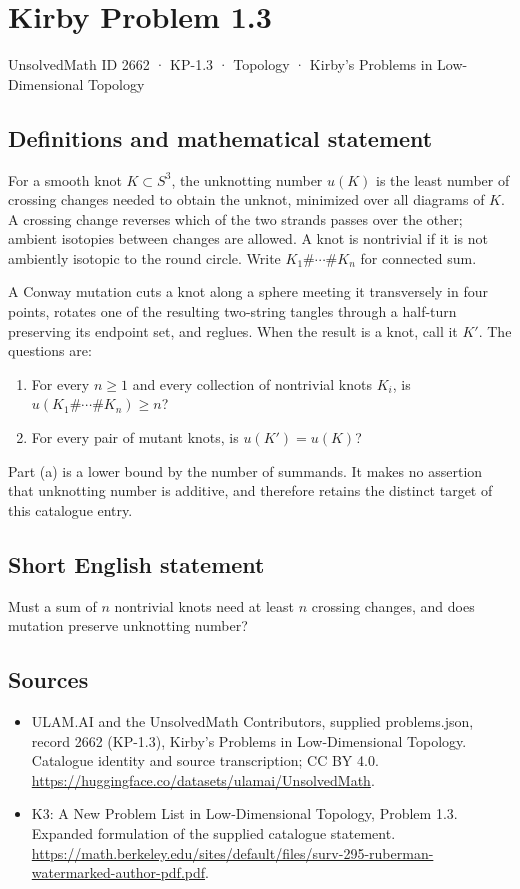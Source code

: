 \documentclass[11pt,a4paper]{article}
\begin{document}
\section*{Kirby Problem 1.3}\label{2662}
{\small UnsolvedMath ID 2662 · KP-1.3 · Topology · Kirby's Problems in Low-Dimensional Topology}
\subsection{Definitions and mathematical statement}
For a smooth knot $K\subset S^3$, the unknotting number $u(K)$ is the least number
of crossing changes needed to obtain the unknot, minimized over all diagrams of
$K$. A crossing change reverses which of the two strands passes over the other;
ambient isotopies between changes are allowed. A knot is nontrivial if it is not
ambiently isotopic to the round circle. Write $K_1\#\cdots\#K_n$ for connected sum.

A Conway mutation cuts a knot along a sphere meeting it transversely in four
points, rotates one of the resulting two-string tangles through a half-turn
preserving its endpoint set, and reglues. When the result is a knot, call it $K'$.
The questions are:
\begin{enumerate}
\item For every $n\geq1$ and every collection of nontrivial knots $K_i$, is
$u(K_1\#\cdots\#K_n)\geq n$?
\item For every pair of mutant knots, is $u(K')=u(K)$?
\end{enumerate}
Part (a) is a lower bound by the number of summands. It makes no assertion that
unknotting number is additive, and therefore retains the distinct target of this
catalogue entry.
\subsection{Short English statement}
Must a sum of $n$ nontrivial knots need at least $n$ crossing changes, and does mutation preserve unknotting number?
\subsection{Sources}
\begin{itemize}
\item[S1] ULAM.AI and the UnsolvedMath Contributors, supplied problems.json, record 2662 (KP-1.3), Kirby's Problems in Low-Dimensional Topology. Catalogue identity and source transcription; CC BY 4.0.
\url{https://huggingface.co/datasets/ulamai/UnsolvedMath}.
\item[S2] K3: A New Problem List in Low-Dimensional Topology, Problem 1.3. Expanded formulation of the supplied catalogue statement.
\url{https://math.berkeley.edu/sites/default/files/surv-295-ruberman-watermarked-author-pdf.pdf}.
\end{itemize}
\end{document}
